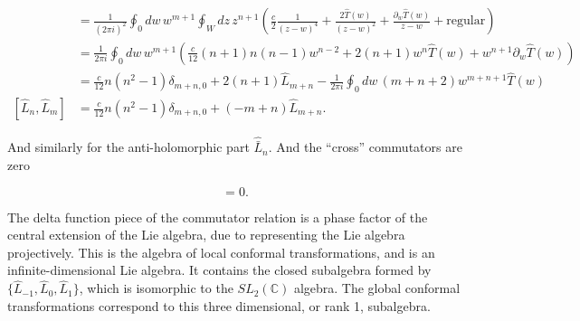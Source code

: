 \begin{align}
[\hat{L}_n, \hat{L}_m ] &= \frac{1}{(2\pi i)^2} \oint_0 dw \, w^{m+1} \oint_W dz \, z^{n+1} \left( \frac{c}{2} \frac{1}{(z-w)^4} + \frac{2 \hat{T} (w)}{(z-w)^2} + \frac{\partial_w \hat{T} (w)}{z-w} + \text{regular} \right) \\
&= \frac{1}{2\pi i} \oint_0 dw \, w^{m+1} \left( \frac{c}{12} (n+1)n(n-1) w^{n-2} + 2(n+1) w^n \hat{T} (w) + w^{n+1} \partial_w \hat{T} (w) \right) \\
&= \frac{c}{12} n (n^2 - 1) \delta_{m+n,0} + 2 (n+1) \hat{L}_{m+n} - \frac{1}{2\pi i} \oint_0 dw \, (m+n+2) w^{m+n+1} \hat{T} (w) \\
[\hat{L}_n, \hat{L}_m ] &= \frac{c}{12} n (n^2 -1) \delta_{m+n,0} + (-m+n) \hat{L}_{m+n}.
\end{align}

\noindent And similarly for the anti-holomorphic part $\hat{\bar{L}}_n$. And the ``cross'' commutators are zero

\begin{equation}
[\hat{L}_n, \hat{\bar{L}}_m ] = 0.
\end{equation}

\noindent The delta function piece of the commutator relation is a phase factor of the central extension of the Lie algebra, due to representing the Lie algebra projectively. This is the algebra of local conformal transformations, and is an infinite-dimensional Lie algebra. It contains the closed subalgebra formed by $\{ \hat{L}_{-1}, \hat{L}_0, \hat{L}_1 \}$, which is isomorphic to the $SL_2 (\mathbb{C})$ algebra. The global conformal transformations correspond to this three dimensional, or rank 1, subalgebra.